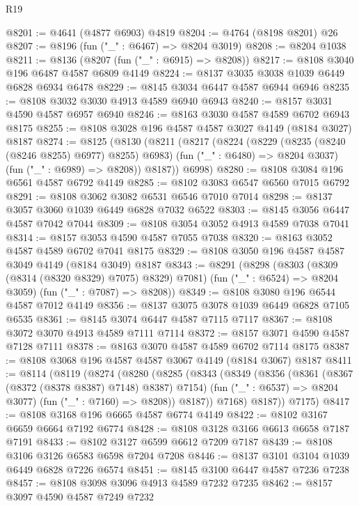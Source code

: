 \begin{lexlean}{R19}
\begin{coremodule}
@8201 := @4641 (@4877 @6903) @4819
@8204 := @4764 (@8198 @8201) @26
@8207 := @8196 (fun ("_" : @6467) => @8204 @3019)
@8208 := @8204 @1038
@8211 := @8136 (@8207 (fun ("_" : @6915) => @8208))
@8217 := @8108 @3040 @196 @6487 @4587 @6809 @4149
@8224 := @8137 @3035 @3038 @1039 @6449 @6828 @6934 @6478
@8229 := @8145 @3034 @6447 @4587 @6944 @6946
@8235 := @8108 @3032 @3030 @4913 @4589 @6940 @6943
@8240 := @8157 @3031 @4590 @4587 @6957 @6940
@8246 := @8163 @3030 @4587 @4589 @6702 @6943 @8175
@8255 := @8108 @3028 @196 @4587 @4587 @3027 @4149 (@8184 @3027) @8187
@8274 := @8125
    (@8130
      (@8211
        (@8217
          (@8224
            (@8229 (@8235 (@8240 (@8246 @8255) @6977) @8255) @6983)
            (fun ("_" : @6480) => @8204 @3037)
            (fun ("_" : @6989) => @8208))
          @8187))
      @6998)
@8280 := @8108 @3084 @196 @6561 @4587 @6792 @4149
@8285 := @8102 @3083 @6547 @6560 @7015 @6792
@8291 := @8108 @3062 @3082 @6531 @6546 @7010 @7014
@8298 := @8137 @3057 @3060 @1039 @6449 @6828 @7032 @6522
@8303 := @8145 @3056 @6447 @4587 @7042 @7044
@8309 := @8108 @3054 @3052 @4913 @4589 @7038 @7041
@8314 := @8157 @3053 @4590 @4587 @7055 @7038
@8320 := @8163 @3052 @4587 @4589 @6702 @7041 @8175
@8329 := @8108 @3050 @196 @4587 @4587 @3049 @4149 (@8184 @3049) @8187
@8343 := @8291
    (@8298
      (@8303 (@8309 (@8314 (@8320 @8329) @7075) @8329) @7081)
      (fun ("_" : @6524) => @8204 @3059)
      (fun ("_" : @7087) => @8208))
@8349 := @8108 @3080 @196 @6544 @4587 @7012 @4149
@8356 := @8137 @3075 @3078 @1039 @6449 @6828 @7105 @6535
@8361 := @8145 @3074 @6447 @4587 @7115 @7117
@8367 := @8108 @3072 @3070 @4913 @4589 @7111 @7114
@8372 := @8157 @3071 @4590 @4587 @7128 @7111
@8378 := @8163 @3070 @4587 @4589 @6702 @7114 @8175
@8387 := @8108 @3068 @196 @4587 @4587 @3067 @4149 (@8184 @3067) @8187
@8411 := @8114
    (@8119
      (@8274
        (@8280
          (@8285
            (@8343
              (@8349
                (@8356
                  (@8361 (@8367 (@8372 (@8378 @8387) @7148) @8387) @7154)
                  (fun ("_" : @6537) => @8204 @3077)
                  (fun ("_" : @7160) => @8208))
                @8187))
            @7168)
          @8187))
      @7175)
@8417 := @8108 @3168 @196 @6665 @4587 @6774 @4149
@8422 := @8102 @3167 @6659 @6664 @7192 @6774
@8428 := @8108 @3128 @3166 @6613 @6658 @7187 @7191
@8433 := @8102 @3127 @6599 @6612 @7209 @7187
@8439 := @8108 @3106 @3126 @6583 @6598 @7204 @7208
@8446 := @8137 @3101 @3104 @1039 @6449 @6828 @7226 @6574
@8451 := @8145 @3100 @6447 @4587 @7236 @7238
@8457 := @8108 @3098 @3096 @4913 @4589 @7232 @7235
@8462 := @8157 @3097 @4590 @4587 @7249 @7232

\end{coremodule}
\end{lexlean}
